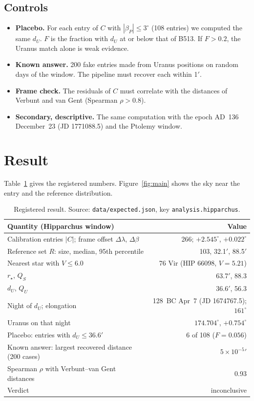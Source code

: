 \documentclass[11pt]{article}
\newcommand{\am}{$'$}
\begin{document}
\subsection{Controls}
\begin{itemize}
\item \textbf{Placebo.} For each entry of $C$ with $|\beta_P|\le3^\circ$ (108 entries) we computed the same $d_U$. $F$ is the fraction with $d_U$ at or below that of B513. If $F>0.2$, the Uranus match alone is weak evidence.
\item \textbf{Known answer.} 200 fake entries made from Uranus positions on random days of the window. The pipeline must recover each within 1\am.
\item \textbf{Frame check.} The residuals of $C$ must correlate with the distances of Verbunt and van Gent (Spearman $\rho>0.8$).
\item \textbf{Secondary, descriptive.} The same computation with the epoch AD~136 December~23 (JD 1771088.5) and the Ptolemy window.
\end{itemize}

\section{Result}
Table~\ref{tab:main} gives the registered numbers. Figure~\ref{fig:main} shows the sky near the entry and the reference distribution.

\begin{table}[h]
\centering\small
\begin{tabular}{lr}\toprule
Quantity (Hipparchus window) & Value \\\midrule
Calibration entries $|C|$; frame offset $\Delta\lambda$, $\Delta\beta$ & 266; $+2.545^\circ$, $+0.022^\circ$ \\
Reference set $R$: size, median, 95th percentile & 103, 32.1\am, 88.5\am \\
Nearest star with $V\le6.0$ & 76 Vir (HIP 66098, $V=5.21$) \\
$r_\star$, $Q_S$ & 63.7\am, 88.3 \\
$d_U$, $Q_U$ & 36.6\am, 56.3 \\
Night of $d_U$; elongation & 128~BC Apr~7 (JD 1674767.5); $161^\circ$ \\
Uranus on that night & $174.704^\circ$, $+0.754^\circ$ \\
Placebo: entries with $d_U\le36.6$\am & 6 of 108 ($F=0.056$) \\
Known answer: largest recovered distance (200 cases) & $5\times10^{-5}$\am \\
Spearman $\rho$ with Verbunt--van Gent distances & 0.93 \\
\midrule
Verdict & inconclusive \\\bottomrule
\end{tabular}
\caption{Registered result. Source: \texttt{data/expected.json}, key \texttt{analysis.hipparchus}.}
\label{tab:main}
\end{table}
\end{document}
